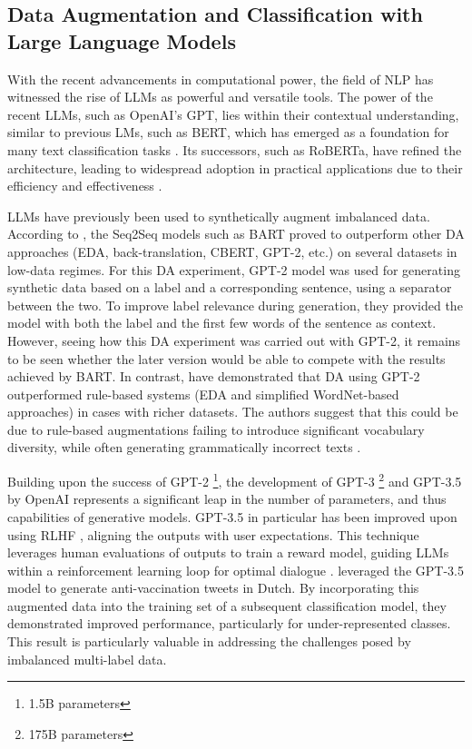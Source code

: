 \documentclass[manuscript]{clv3}
\begin{document}
\subsection{Data Augmentation and Classification with Large Language Models}
With the recent advancements in computational power, the field of NLP has witnessed the rise of LLMs as powerful and versatile tools. The power of the recent LLMs, such as OpenAI's GPT, lies within their contextual understanding, similar to previous LMs, such as BERT, which has emerged as a foundation for many text classification tasks \cite{DBLP:journals/corr/abs-1810-04805}. Its successors, such as RoBERTa, have refined the architecture, leading to widespread adoption in practical applications due to their efficiency and effectiveness \cite{94205144dd7945cc99b5a6544451b668}.

LLMs have previously been used to synthetically augment imbalanced data. According to \citet{DBLP:journals/corr/abs-2003-02245}, the Seq2Seq models such as BART proved to outperform other DA approaches (EDA, back-translation, CBERT, GPT-2, etc.) on several datasets in low-data regimes. For this DA experiment, GPT-2 model was used for generating synthetic data based on a label and a corresponding sentence, using a separator between the two. To improve label relevance during generation, they provided the model with both the label and the first few words of the sentence as context. However, seeing how this DA experiment was carried out with GPT-2, it remains to be seen whether the later version would be able to compete with the results achieved by BART. In contrast, \citet{zhang2020data} have demonstrated that DA using GPT-2 outperformed rule-based systems (EDA and simplified WordNet-based approaches) in cases with richer datasets. The authors suggest that this could be due to rule-based augmentations failing to introduce significant vocabulary diversity, while often generating grammatically incorrect texts \cite{zhang2020data}.

Building upon the success of GPT-2 \footnote{1.5B parameters}, the development of GPT-3 \footnote{175B parameters} \cite{brown2020languagemodelsfewshotlearners} and GPT-3.5 \cite{Radford2019LanguageMA} by OpenAI represents a significant leap in the number of parameters, and thus capabilities of generative models. GPT-3.5 in particular has been improved upon using RLHF \cite{ouyang2022traininglanguagemodelsfollow}, aligning the outputs with user expectations. This technique leverages human evaluations of outputs to train a reward model, guiding LLMs within a reinforcement learning loop for optimal dialogue \cite{møller2023prompt}. \citet{van-nooten-daelemans-2023-improving} leveraged the GPT-3.5 model to generate anti-vaccination tweets in Dutch. By incorporating this augmented data into the training set of a subsequent classification model, they demonstrated improved performance, particularly for under-represented classes. This result is particularly valuable in addressing the challenges posed by imbalanced multi-label data.
\end{document}
